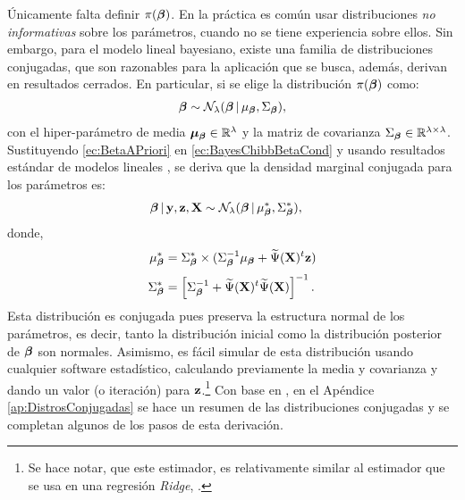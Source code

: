 \documentclass[../Main/Main.tex]{subfiles}
\begin{document}
Únicamente falta definir $\pi(\bm{\beta})$. En la práctica es común usar distribuciones \textit{no informativas} sobre los parámetros, cuando no se tiene experiencia sobre ellos. Sin embargo, para el modelo lineal bayesiano, existe una familia de distribuciones conjugadas, que son razonables para la aplicación que se busca, además, derivan en resultados cerrados. En particular, si se elige la distribución $\pi(\bm{\beta})$ como:
\begin{align}
	\bm{\beta} \sim \mathcal{N}_{\lambda}(\bm{\beta}\,|\,\mu_{\bm{\beta}}, \Sigma_{\bm{\beta}}), \label{ec:BetaAPriori}
\end{align}
con el hiper-parámetro de media $\bm{\mu}_{\bm{\beta}}\in \mathbb{R}^{\lambda}$ y la matriz de covarianza $\Sigma_{\bm{\beta}} \in \mathbb{R}^{\lambda \times \lambda}$. Sustituyendo \eqref{ec:BetaAPriori} en \eqref{ec:BayesChibbBetaCond} y usando resultados estándar de modelos lineales \autocite{banerjee2008gory}, se deriva que la densidad marginal conjugada para los parámetros es:
\begin{align}
	\bm{\beta}\,|\,\mathbf{y},\mathbf{z},\mathbf{X} &\sim \mathcal{N}_{\lambda}(\bm{\beta}\,|\,\mu_{\bm{\beta}}^*, \Sigma_{\bm{\beta}}^*), \label{ec:SimBeta}
\end{align}	
donde,
\begin{align*}
	\mu_{\bm{\beta}}^* &= \Sigma_{\bm{\beta}}^* \times (\Sigma_{\bm{\beta}}^{-1}\mu_{\bm{\beta}} + \widetilde{\Psi}(\mathbf{X})^t\mathbf{z} )\nonumber \\[2pt]
	 \Sigma_{\bm{\beta}}^* &= \left[\Sigma_{\bm{\beta}}^{-1} + \widetilde{\Psi}(\mathbf{X})^t\widetilde{\Psi}(\mathbf{X})\right]^{-1}.\nonumber
\end{align*}	 
Esta distribución es conjugada pues preserva la estructura normal de los parámetros, es decir, tanto la distribución inicial como la distribución posterior de $\bm{\beta}$ son normales. Asimismo, es fácil simular de esta distribución usando cualquier software estadístico, calculando previamente la media y covarianza y dando un valor (o iteración) para $\mathbf{z}$.\footnote{Se hace notar, que este estimador, es relativamente similar al estimador que se usa en una regresión \textit{Ridge}, \autocite{tibshirani1996regression}.} Con base en \citet{banerjee2008gory}, en el Apéndice \ref{ap:DistrosConjugadas} se hace un resumen de las distribuciones conjugadas y se completan algunos de los pasos de esta derivación. 
\end{document}

